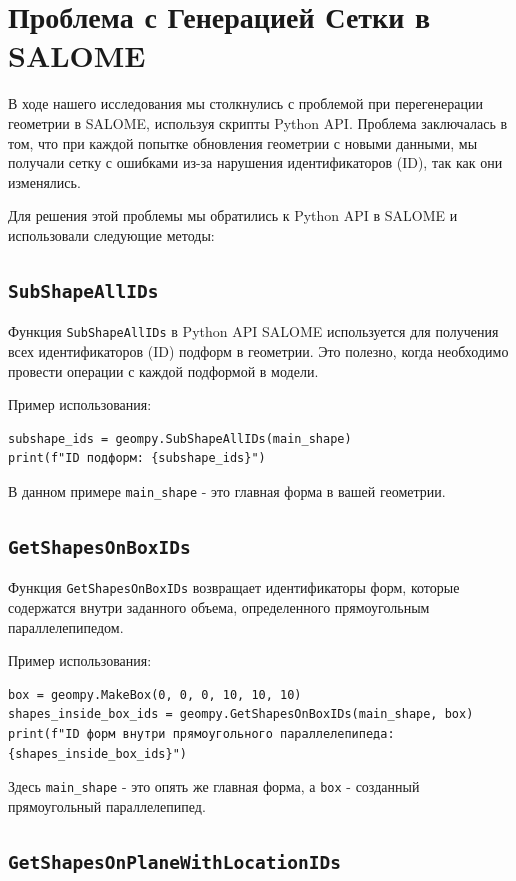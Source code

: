 \documentclass[a4paper,12pt]{article}
\theoremstyle{plain} %
\theoremstyle{definition} %
\theoremstyle{remark} %
\begin{document}
\section{Проблема с Генерацией Сетки в SALOME}

В ходе нашего исследования мы столкнулись с проблемой при перегенерации геометрии в SALOME, используя скрипты Python API. Проблема заключалась в том, что при каждой попытке обновления геометрии с новыми данными, мы получали сетку с ошибками из-за нарушения идентификаторов (ID), так как они изменялись.

Для решения этой проблемы мы обратились к Python API в SALOME и использовали следующие методы:

\subsection{\texttt{SubShapeAllIDs}}

Функция \texttt{SubShapeAllIDs} в Python API SALOME используется для получения всех идентификаторов (ID) подформ в геометрии. Это полезно, когда необходимо провести операции с каждой подформой в модели.

Пример использования:
\begin{verbatim}
subshape_ids = geompy.SubShapeAllIDs(main_shape)
print(f"ID подформ: {subshape_ids}")
\end{verbatim}

В данном примере \texttt{main\_shape} - это главная форма в вашей геометрии.

\subsection{\texttt{GetShapesOnBoxIDs}}

Функция \texttt{GetShapesOnBoxIDs} возвращает идентификаторы форм, которые содержатся внутри заданного объема, определенного прямоугольным параллелепипедом.

Пример использования:
\begin{verbatim}
box = geompy.MakeBox(0, 0, 0, 10, 10, 10)
shapes_inside_box_ids = geompy.GetShapesOnBoxIDs(main_shape, box)
print(f"ID форм внутри прямоугольного параллелепипеда: {shapes_inside_box_ids}")
\end{verbatim}

Здесь \texttt{main\_shape} - это опять же главная форма, а \texttt{box} - созданный прямоугольный параллелепипед.

\subsection{\texttt{GetShapesOnPlaneWithLocationIDs}}
\end{document}
